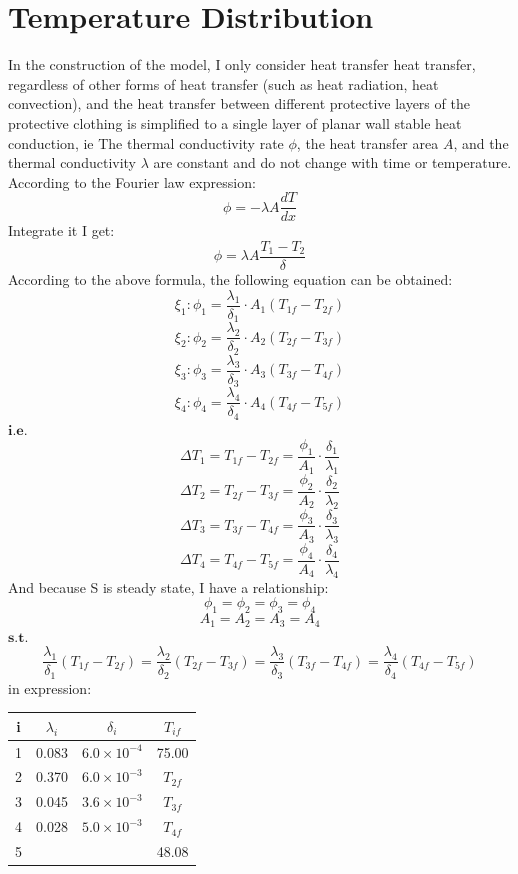 \documentclass[12pt]{ctexart}
\begin{document}
\section{Temperature Distribution}
In the construction of the model, I only consider heat transfer heat transfer, regardless of other forms of heat transfer (such as heat radiation, heat convection), and the heat transfer between different protective layers of the protective clothing is simplified to a single layer of planar wall stable heat conduction, ie The thermal conductivity rate $\phi$, the heat transfer area $A$, and the thermal conductivity $\lambda$ are constant and do not change with time or temperature.\\
\indent According to the Fourier law expression\cite{volz1996transient}:
\[\phi = -\lambda A\frac{dT}{dx}\]
\indent Integrate it I get:\\
\[\phi = \lambda A\frac{T_{1}-T_{2}}{\delta}\]
\indent According to the above formula, the following equation can be obtained\cite{li2004fourier}:\\
    \[\xi_1 : \phi_{1} = \frac{\lambda_{1}}{\delta_{1}}\cdot A_{1}(T_{1f}-T_{2f})\]
    \[\xi_2 : \phi_{2} = \frac{\lambda_{2}}{\delta_{2}}\cdot A_{2}(T_{2f}-T_{3f})\]
    \[\xi_3 : \phi_{3} = \frac{\lambda_{3}}{\delta_{3}}\cdot A_{3}(T_{3f}-T_{4f})\]
    \[\xi_4 : \phi_{4} = \frac{\lambda_{4}}{\delta_{4}}\cdot A_{4}(T_{4f}-T_{5f})\]
\indent $\textbf{i.e.}$\\
    \[\Delta T_{1} = T_{1f}-T_{2f}= \frac{\phi_{1}}{A_{1}}\cdot \frac{\delta_{1}}{\lambda_{1}}\]
    \[\Delta T_{2} = T_{2f}-T_{3f}= \frac{\phi_{2}}{A_{2}}\cdot \frac{\delta_{2}}{\lambda_{2}}\]
    \[\Delta T_{3} = T_{3f}-T_{4f}= \frac{\phi_{3}}{A_{3}}\cdot \frac{\delta_{3}}{\lambda_{3}}\]
    \[\Delta T_{4} = T_{4f}-T_{5f}= \frac{\phi_{4}}{A_{4}}\cdot \frac{\delta_{4}}{\lambda_{4}}\]
\indent And because S is steady state, I have a relationship:\\
    \[\phi_{1} = \phi_{2} = \phi_{3} = \phi_{4}\]
    \[A_{1} = A_{2} = A_{3} = A_{4}\]
\indent $\textbf{s.t.}$\\
    \[\frac{\lambda_{1}}{\delta_{1}}(T_{1f}-T_{2f}) = \frac{\lambda_{2}}{\delta_{2}}(T_{2f}-T_{3f}) = \frac{\lambda_{3}}{\delta_{3}}(T_{3f}-T_{4f}) = \frac{\lambda_{4}}{\delta_{4}}(T_{4f}-T_{5f})\]
\indent in expression:\\
\begin{center}
\begin{tabular}{c|c|c|c}
\toprule
    i & $\lambda_{i}$ & $\delta_{i}$ & $T_{if}$\\
\midrule
    1 & 0.083 & $6.0\times 10^{-4}$ & 75.00\\
\midrule
    2 & 0.370 & $6.0\times 10^{-3}$ & $T_{2f}$\\
\midrule
    3 & 0.045 & $3.6\times 10^{-3}$ & $T_{3f}$\\
\midrule
    4 & 0.028 & $5.0\times 10^{-3}$ & $T_{4f}$\\
\midrule
    5 & & & 48.08\\
\midrule
\bottomrule
\end{tabular}
\end{center}
\end{document}
